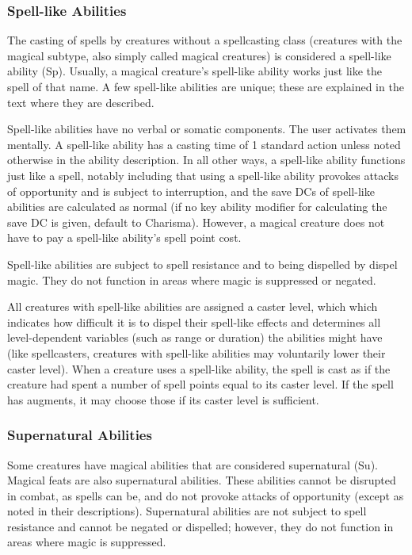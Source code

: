 \documentclass[../VancianToPsionics.tex]{subfiles}
\begin{document}
\subsubsection{Spell-like Abilities}
The casting of spells by creatures without a spellcasting class (creatures with the magical subtype, also simply called magical creatures) is considered a spell-like ability (Sp). Usually, a magical creature's spell-like ability works just like the spell of that name. A few spell-like abilities are unique; these are explained in the text where they are described. 

Spell-like abilities have no verbal or somatic components. The user activates them mentally. A spell-like ability has a casting time of 1 standard action unless noted otherwise in the ability description. In all other ways, a spell-like ability functions just like a spell, notably including that using a spell-like ability provokes attacks of opportunity and is subject to interruption, and the save DCs of spell-like abilities are calculated as normal (if no key ability modifier for calculating the save DC is given, default to Charisma). However, a magical creature does not have to pay a spell-like ability's spell point cost.

Spell-like abilities are subject to spell resistance and to being dispelled by dispel magic. They do not function in areas where magic is suppressed or negated.

All creatures with spell-like abilities are assigned a caster level, which which indicates how difficult it is to dispel their spell-like effects and determines all level-dependent variables (such as range or duration) the abilities might have (like spellcasters, creatures with spell-like abilities may voluntarily lower their caster level). When a creature uses a spell-like ability, the spell is cast as if the creature had spent a number of spell points equal to its caster level. If the spell has augments, it may choose those if its caster level is sufficient.

\subsubsection{Supernatural Abilities}
Some creatures have magical abilities that are considered supernatural (Su). Magical feats are also supernatural abilities. These abilities cannot be disrupted in combat, as spells can be, and do not provoke attacks of opportunity (except as noted in their descriptions). Supernatural abilities are not subject to spell resistance and cannot be negated or dispelled; however, they do not function in areas where magic is suppressed.
\end{document}
